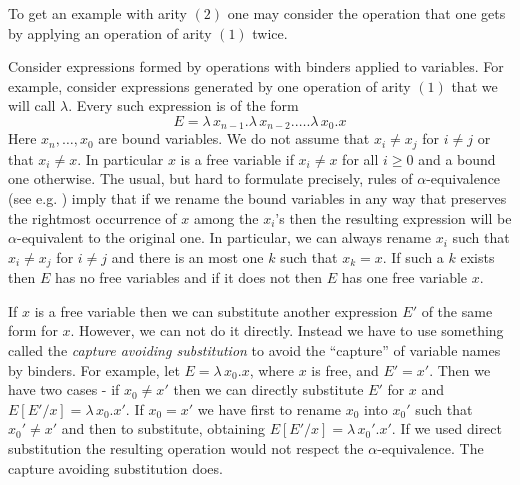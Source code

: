 \documentclass[12pt]{amsart}
\begin{document}
To get an example with arity $(2)$ one may consider the operation that one gets by applying an operation of arity $(1)$ twice.

Consider expressions formed by operations with binders applied to variables. For example, consider expressions generated by one operation of arity $(1)$ that we will call $\lambda$. Every such expression is of the form
%
$$E=\lambda\,x_{n-1}.\lambda\,x_{n-2}.\dots.\lambda\,x_0.x$$
%
Here $x_n,\dots,x_{0}$ are bound variables. We do not assume that $x_i\ne x_j$ for $i\ne j$ or that $x_i\ne x$. In particular $x$ is a free variable if $x_i\ne x$ for all $i\ge 0$ and a bound one otherwise. The usual, but hard to formulate precisely, rules of $\alpha$-equivalence (see e.g. \cite[Def. 2.1.11, p.26]{Barendregt}) imply that if we rename the bound variables in any way that preserves the rightmost occurrence of $x$ among the $x_i$'s then the resulting expression will be $\alpha$-equivalent to the original one. In particular, we can always rename $x_i$ such that $x_i\ne x_j$ for $i\ne j$ and there is an most one  
$k$ such that $x_k=x$. If such a $k$ exists then $E$ has no free variables and if it does not then $E$ has one free variable $x$. 

If $x$ is a free variable then we can substitute another expression $E'$ of the same form for $x$. However, we can not do it directly. Instead we have to use something called the {\em capture avoiding substitution} to avoid the ``capture'' of variable names by binders. For example, let $E=\lambda\,x_0.x$, where $x$ is free, and $E'=x'$. Then we have two cases - if $x_0\ne x'$ then we can directly substitute $E'$ for $x$ and $E[E'/x]=\lambda\,x_0.x'$. If $x_0=x'$ we have first to rename $x_0$ into $x_0'$ such that $x_0'\ne x'$ and then to substitute, obtaining $E[E'/x]=\lambda\,x_0'.x'$. If we used direct substitution the resulting operation would not respect the $\alpha$-equivalence. The capture avoiding substitution does. 
\end{document}
